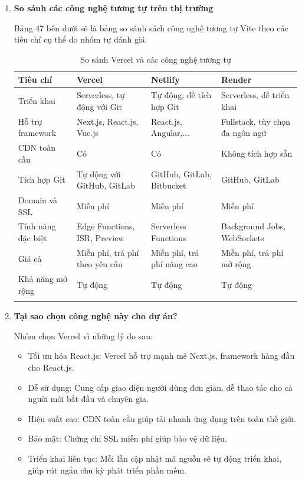 \begin{enumerate}
	\item \textbf{So sánh các công nghệ tương tự trên thị trường}
	
	Bảng 47 bên dưới sẽ là bảng so sánh sách công nghệ tương tự Vite theo các tiêu chí cụ thể do nhóm tự đánh giá.
	\begin{longtable}{|>{\raggedright\arraybackslash}m{3cm}|>{\centering\arraybackslash}m{3cm}|>{\centering\arraybackslash}m{3cm}|>{\centering\arraybackslash}m{3cm}|}
		\hline
		\textbf{Tiêu chí} & \textbf{Vercel} & \textbf{Netlify} & \textbf{Render} \\ 
		\hline
		Triển khai & Serverless, tự động với Git & Tự động, dễ tích hợp Git & Serverless, dễ triển khai \\ 
		\hline
		Hỗ trợ framework & Next.js, React.js, Vue.js & React.js, Angular,... & Fullstack, tùy chọn đa ngôn ngữ \\ 
		\hline
		CDN toàn cầu & Có & Có & Không tích hợp sẵn   \\ 
		\hline
		Tích hợp Git & Tự động với GitHub, GitLab & GitHub, GitLab, Bitbucket & GitHub, GitLab  \\ 
		\hline
		Domain và SSL & Miễn phí & Miễn phí & Miễn phí \\ 
		\hline
		Tính năng đặc biệt & Edge Functions, ISR, Preview & Serverless Functions & Background Jobs, WebSockets \\ 
		\hline
		Giá cả & Miễn phí, trả phí theo yêu cầu & Miễn phí, trả phí nâng cao & Miễn phí, trả phí mở rộng \\ 
		\hline
		Khả năng mở rộng & Tự động & Tự động & Tự động \\ 
		\hline
		\caption{So sánh Vercel và các công nghệ tương tự}
	\end{longtable}
	
	\item \textbf{Tại sao chọn công nghệ này cho dự án?}
	
	Nhóm chọn Vercel vì những lý do sau:
	\begin{itemize}
		\item Tối ưu hóa React.js: Vercel hỗ trợ mạnh mẽ Next.js, framework hàng đầu cho React.js.
		\item Dễ sử dụng: Cung cấp giao diện người dùng đơn giản, dễ thao tác cho cả người mới bắt đầu và chuyên gia.
		\item Hiệu suất cao: CDN toàn cầu giúp tải nhanh ứng dụng trên toàn thế giới.
		\item Bảo mật: Chứng chỉ SSL miễn phí giúp bảo vệ dữ liệu.
		\item Triển khai liên tục: Mỗi lần cập nhật mã nguồn sẽ tự động triển khai, giúp rút ngắn chu kỳ phát triển phần mềm.
	\end{itemize}
	
\end{enumerate}
